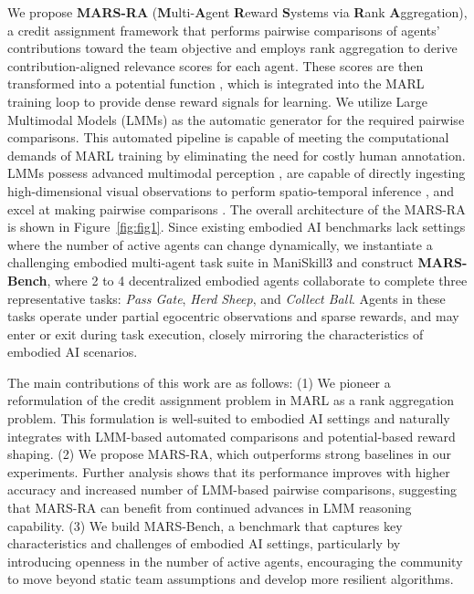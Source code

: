 \documentclass[11pt]{article}
\begin{document}
%

%

We propose \textbf{MARS-RA} (\textbf{M}ulti-\textbf{A}gent \textbf{R}eward \textbf{S}ystems via \textbf{R}ank \textbf{A}ggregation), a credit assignment framework that performs pairwise comparisons of agents’ contributions toward the team objective and employs rank aggregation to derive contribution-aligned relevance scores for each agent. These scores are then transformed into a potential function \cite{ng1999policy}, which is integrated into the MARL training loop to provide dense reward signals for learning. We utilize Large Multimodal Models (LMMs) \cite{team2023gemini, yang2025qwen3, liu2023visual, dong2025interleaved, zhao2026unlearning} as the automatic generator for the required pairwise comparisons. This automated pipeline is capable of meeting the computational demands of MARL training by eliminating the need for costly human annotation. LMMs possess advanced multimodal perception \cite{huang2023language, li2024lmeye, li2026videothinker, li2025videopro}, are capable of directly ingesting high-dimensional visual observations to perform spatio-temporal inference \cite{wang2026towermind, rocamonde2023vision, zhao2024symmetric}, and excel at making pairwise comparisons \cite{shi2024judging, di2025balancing}. The overall architecture of the MARS-RA is shown in Figure~\ref{fig:fig1}. Since existing embodied AI benchmarks lack settings where the number of active agents can change dynamically, we instantiate a challenging embodied multi-agent task suite in ManiSkill3 \cite{tao2024maniskill3} and construct \textbf{MARS-Bench}, where 2 to 4 decentralized embodied agents collaborate to complete three representative tasks: \textit{Pass Gate}, \textit{Herd Sheep}, and \textit{Collect Ball}. Agents in these tasks operate under partial egocentric observations and sparse rewards, and may enter or exit during task execution, closely mirroring the characteristics of embodied AI scenarios.

%

%



The main contributions of this work are as follows: (1) We pioneer a reformulation of the credit assignment problem in MARL as a rank aggregation problem. This formulation is well-suited to embodied AI settings and naturally integrates with LMM-based automated comparisons and potential-based reward shaping. (2) We propose MARS-RA, which outperforms strong baselines in our experiments. Further analysis shows that its performance improves with higher accuracy and increased number of LMM-based pairwise comparisons, suggesting that MARS-RA can benefit from continued advances in LMM reasoning capability. (3) We build MARS-Bench, a benchmark that captures key characteristics and challenges of embodied AI settings, particularly by introducing openness in the number of active agents, encouraging the community to move beyond static team assumptions and develop more resilient algorithms.
\end{document}
